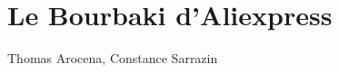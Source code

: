 \documentclass{article}
\begin{document}
\part*{Le Bourbaki d'Aliexpress}
Thomas Arocena, Constance Sarrazin
\tableofcontents
\pagebreak
\begin{multicols*}{2}

\end{multicols*}
\end{document}
